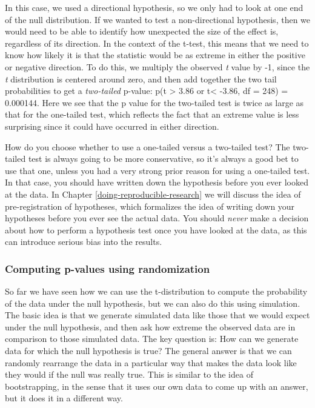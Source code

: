 \documentclass[12pt,]{book}
\theoremstyle{definition}
\theoremstyle{definition}
\theoremstyle{definition}
\theoremstyle{remark}
\begin{document}
In this case, we used a directional hypothesis, so we only had to look at one end of the null distribution. If we wanted to test a non-directional hypothesis, then we would need to be able to identify how unexpected the size of the effect is, regardless of its direction. In the context of the t-test, this means that we need to know how likely it is that the statistic would be as extreme in either the positive or negative direction. To do this, we multiply the observed \emph{t} value by -1, since the \emph{t} distribution is centered around zero, and then add together the two tail probabilities to get a \emph{two-tailed} p-value: p(t \textgreater{} 3.86 or t\textless{} -3.86, df = 248) = 0.000144. Here we see that the p value for the two-tailed test is twice as large as that for the one-tailed test, which reflects the fact that an extreme value is less surprising since it could have occurred in either direction.

How do you choose whether to use a one-tailed versus a two-tailed test? The two-tailed test is always going to be more conservative, so it's always a good bet to use that one, unless you had a very strong prior reason for using a one-tailed test. In that case, you should have written down the hypothesis before you ever looked at the data. In Chapter \ref{doing-reproducible-research} we will discuss the idea of pre-registration of hypotheses, which formalizes the idea of writing down your hypotheses before you ever see the actual data. You should \emph{never} make a decision about how to perform a hypothesis test once you have looked at the data, as this can introduce serious bias into the results.

\hypertarget{computing-p-values-using-randomization}{%
\subsubsection{Computing p-values using randomization}\label{computing-p-values-using-randomization}}

So far we have seen how we can use the t-distribution to compute the probability of the data under the null hypothesis, but we can also do this using simulation. The basic idea is that we generate simulated data like those that we would expect under the null hypothesis, and then ask how extreme the observed data are in comparison to those simulated data. The key question is: How can we generate data for which the null hypothesis is true? The general answer is that we can randomly rearrange the data in a particular way that makes the data look like they would if the null was really true. This is similar to the idea of bootstrapping, in the sense that it uses our own data to come up with an answer, but it does it in a different way.
\end{document}
